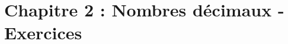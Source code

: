 

\newpage

\section*{Chapitre 2 : Nombres décimaux - Exercices}






\setcounter{exrcntr}{0}

\newpage

%
